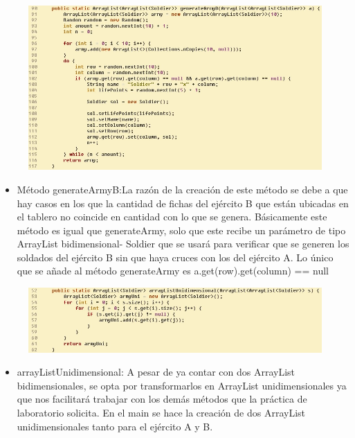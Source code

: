 \documentclass{article}
\begin{document}
	
	\begin{figure}[H]
		\centering
		\includegraphics[width=1.1\textwidth,keepaspectratio]{img/generateArmyB.jpg}
	\end{figure}
	
	\begin{itemize}	
		\item Método generateArmyB:La razón de la creación de este método se debe a que hay casos en los que la cantidad de fichas del ejército B que están ubicadas en el tablero no coincide en cantidad con lo que se genera. Básicamente este método es igual que generateArmy, solo que este recibe un parámetro de tipo ArrayList bidimensional- Soldier que se usará para verificar que se generen los soldados del ejército B sin que haya cruces con los del ejército A. Lo único que se añade al método generateArmy es a.get(row).get(column) == null
	\end{itemize}
	

	
	\begin{figure}[H]
		\centering
		\includegraphics[width=1.1\textwidth,keepaspectratio]{img/arrayListUni.jpg}
	\end{figure}
	
	\begin{itemize}	
		\item arrayListUnidimensional: A pesar de ya contar con dos ArrayList bidimensionales, se opta por transformarlos en ArrayList unidimensionales ya que nos facilitará trabajar con los demás métodos que la práctica de laboratorio solicita. En el main se hace la creación de dos ArrayList unidimensionales tanto para el ejército A y B.
	\end{itemize}
	
\end{document}
